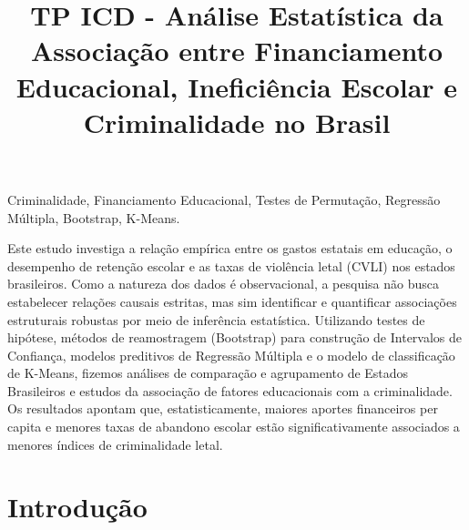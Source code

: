 \documentclass[10pt]{article}
\begin{document}
\noindent



\title{TP ICD - Análise Estatística da Associação entre Financiamento Educacional, Ineficiência Escolar e Criminalidade no Brasil}


\maketitle

\keywords
Criminalidade, Financiamento Educacional, Testes de Permutação, Regressão Múltipla, Bootstrap, K-Means.

\abstract
Este estudo investiga a relação empírica entre os gastos estatais em educação, o desempenho de retenção escolar e as taxas de violência letal (CVLI) nos estados brasileiros. Como a natureza dos dados é observacional, a pesquisa não busca estabelecer relações causais estritas, mas sim identificar e quantificar associações estruturais robustas por meio de inferência estatística. Utilizando testes de hipótese, métodos de reamostragem (Bootstrap) para construção de Intervalos de Confiança, modelos preditivos de Regressão Múltipla e o modelo de classificação de K-Means, fizemos análises de comparação e agrupamento de Estados Brasileiros e estudos da associação de fatores educacionais com a criminalidade. Os resultados apontam que, estatisticamente, maiores aportes financeiros per capita e menores taxas de abandono escolar estão significativamente associados a menores índices de criminalidade letal.

\section{Introdução}
\end{document}
